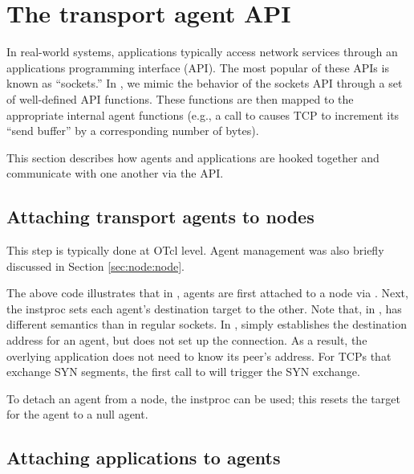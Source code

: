 \section{The transport agent API}
In real-world systems, applications typically access network services through
an applications programming interface (API).  The most popular
of these APIs is known as ``sockets.''  In \ns, we mimic the behavior of the
sockets API through a set of well-defined API functions.  These functions 
are then mapped to the appropriate internal agent functions (e.g.,
a call to  causes TCP to increment its ``send buffer'' 
by a corresponding number of bytes).

This section describes how agents and applications are hooked together and
communicate with one another via the API.

\subsection{Attaching transport agents to nodes}
\label{sec:attachagentnode}
This step is typically done at OTcl level.  Agent management was also briefly
discussed in Section \ref{sec:node:node}.  


The above code illustrates that in \ns, agents are first attached to a node
via .  Next, the  instproc sets each agent's
destination target to the other.  Note that, in \ns,  has
different semantics than in regular sockets.  In \ns,  simply
establishes the destination address for an agent, but does not set up the
connection.  As a result, the overlying application does not need to know
its peer's address.  For TCPs that exchange SYN segments, the first call to 
 will trigger the SYN exchange. 

To detach an agent from a node, the instproc  can be 
used; this resets the target for the agent to a null agent.

\subsection{Attaching applications to agents}
\label{sec:attachappagent}

